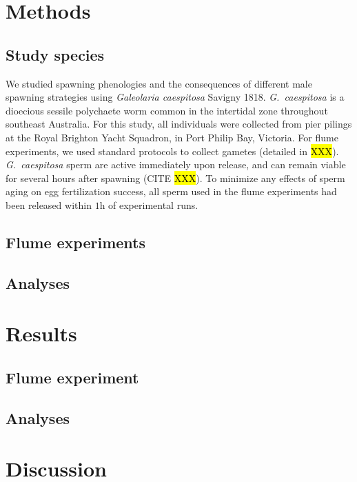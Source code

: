 \documentclass{article}
\begin{document}
\section*{Methods}

	\subsection*{Study species}

	We studied spawning phenologies and the consequences of different male spawning strategies using \textit{Galeolaria caespitosa} Savigny 1818. \textit{G.~caespitosa} is a dioecious sessile polychaete worm common in the intertidal zone throughout southeast Australia. For this study, all individuals were collected from pier pilings at the Royal Brighton Yacht Squadron, in Port Philip Bay, Victoria. For flume experiments, we used standard protocols to collect gametes (detailed in \hl{XXX}). \textit{G.~caespitosa} sperm are active immediately upon release, and can remain viable for several hours after spawning (CITE \hl{XXX}). To minimize any effects of sperm aging on egg fertilization success, all sperm used in the flume experiments had been released within $1$h of experimental runs.


	\subsection*{Flume experiments}

	\subsection*{Analyses}



\section*{Results}

	\subsection*{Flume experiment}

	\subsection*{Analyses}



\section*{Discussion}
\end{document}
